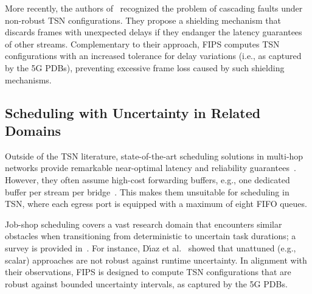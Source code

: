 More recently, the authors of~\cite{10682834} recognized the problem of cascading faults under non-robust TSN configurations.
They propose a shielding mechanism that discards frames with unexpected delays if they endanger the latency guarantees of other streams.
Complementary to their approach, FIPS computes TSN configurations with an increased tolerance for delay variations (i.e., as captured by the 5G PDBs), preventing excessive frame loss caused by such shielding mechanisms.

\subsection{Scheduling with Uncertainty in Related Domains}
Outside of the TSN literature, state-of-the-art scheduling solutions in multi-hop networks provide remarkable near-optimal latency and reliability guarantees~\cite{6155625,infocom24_best_paper}.
However, they often assume high-cost forwarding buffers, e.g., one dedicated buffer per stream per bridge~\cite{6155625}.
This makes them unsuitable for scheduling in TSN, where each egress port is equipped with a maximum of eight FIFO queues.

Job-shop scheduling covers a vast research domain that encounters similar obstacles when transitioning from deterministic to uncertain task durations;
a survey is provided in~\cite{XIONG2022105731}.
For instance, D{\'\i}az et al.~\cite{diaz2023robust} showed that unattuned (e.g., scalar) approaches are not robust against runtime uncertainty.
In alignment with their observations, FIPS is designed to compute TSN configurations that are robust against bounded uncertainty intervals, as captured by the 5G PDBs.

